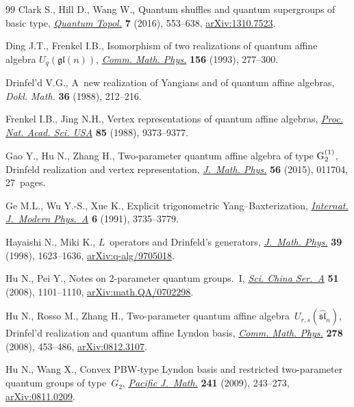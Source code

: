 \documentclass[10pt,a4paper]{amsart}
\numberwithin{equation}{section}
\begin{document}
\begin{thebibliography}{99}
Clark S., Hill D., Wang W., Quantum shuffles and quantum supergroups of basic
 type, \href{https://doi.org/10.4171/QT/81}{\textit{Quantum Topol.}}
 \textbf{7} (2016), 553--638,
 \href{http://arxiv.org/abs/1310.7523}{arXiv:1310.7523}.

Ding J.T., Frenkel I.B., Isomorphism of two realizations of quantum affine
 algebra {$U_q(\mathfrak{gl}(n))$},
 \href{https://doi.org/10.1007/BF02098484}{\textit{Comm. Math. Phys.}}
 \textbf{156} (1993), 277--300.

Drinfel'd V.G., A~new realization of {Y}angians and of quantum affine algebras,
 \textit{Dokl. Math.} \textbf{36} (1988), 212--216.

Frenkel I.B., Jing N.H., Vertex representations of quantum affine algebras,
 \href{https://doi.org/10.1073/pnas.85.24.9373}{\textit{Proc. Nat. Acad. Sci.
 USA}} \textbf{85} (1988), 9373--9377.

Gao Y., Hu N., Zhang H., Two-parameter quantum affine algebra of type {${\rm
 G}_2^{(1)}$}, {D}rinfeld realization and vertex representation,
 \href{https://doi.org/10.1063/1.4905724}{\textit{J.~Math. Phys.}} \textbf{56}
 (2015), 011704, 27~pages.

Ge M.L., Wu Y.-S., Xue K., Explicit trigonometric {Y}ang--{B}axterization,
 \href{https://doi.org/10.1142/S0217751X91001817}{\textit{Internat. J.~Modern
 Phys.~A}} \textbf{6} (1991), 3735--3779.

Hayaishi N., Miki K., {$L$}~operators and {D}rinfeld's generators,
 \href{https://doi.org/10.1063/1.532398}{\textit{J.~Math. Phys.}} \textbf{39}
 (1998), 1623--1636,
 \href{http://arxiv.org/abs/q-alg/9705018}{arXiv:q-alg/9705018}.

Hu N., Pei Y., Notes on 2-parameter quantum groups.~{I},
 \href{https://doi.org/10.1007/s11425-008-0026-y}{\textit{Sci. China Ser.~A}}
 \textbf{51} (2008), 1101--1110,
 \href{http://arxiv.org/abs/math.QA/0702298}{arXiv:math.QA/0702298}.

Hu N., Rosso M., Zhang H., Two-parameter quantum affine
 algebra~{$U_{r,s}(\widehat{\mathfrak{sl}}_n)$}, {D}rinfel'd realization and
 quantum affine {L}yndon basis,
 \href{https://doi.org/10.1007/s00220-007-0405-1}{\textit{Comm. Math. Phys.}}
 \textbf{278} (2008), 453--486,
 \href{http://arxiv.org/abs/0812.3107}{arXiv:0812.3107}.

Hu N., Wang X., Convex {PBW}-type {L}yndon basis and restricted two-parameter
 quantum groups of type~{$G_2$},
 \href{https://doi.org/10.2140/pjm.2009.241.243}{\textit{Pacific J.~Math.}}
 \textbf{241} (2009), 243--273,
 \href{http://arxiv.org/abs/0811.0209}{arXiv:0811.0209}.


\end{thebibliography}
\end{document}
